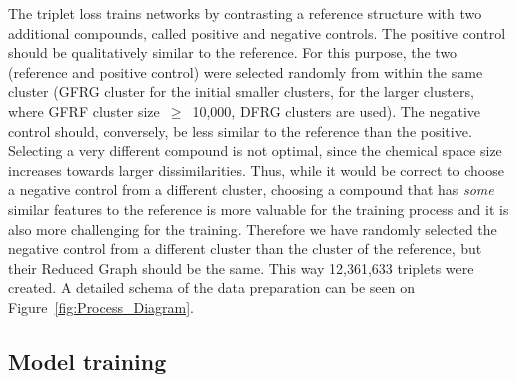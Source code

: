\documentclass[doublespacing]{bmcart}
\begin{document}
The triplet loss trains networks by contrasting a reference structure with two additional compounds, called positive and negative controls. The positive control should be qualitatively similar to the reference. For this purpose, the two (reference and positive control) were selected randomly from within the same cluster (GFRG cluster for the initial smaller clusters, for the larger clusters, where GFRF cluster size~$\geq$~10,000, DFRG clusters are used). The negative control should, conversely, be less similar to the reference than the positive. Selecting a very different compound is not optimal, since the chemical space size increases towards larger dissimilarities. Thus, while it would be correct to choose a negative control from a different cluster, choosing a compound that has \textit{some} similar features to the reference is more valuable for the training process and it is also more challenging for the training. Therefore we have randomly selected the negative control from a different cluster than the cluster of the reference, but their Reduced Graph should be the same. This way 12,361,633 triplets were created. A detailed schema of the data preparation can be seen on Figure~\ref{fig:Process_Diagram}.



\subsection*{Model training}

\end{document}

